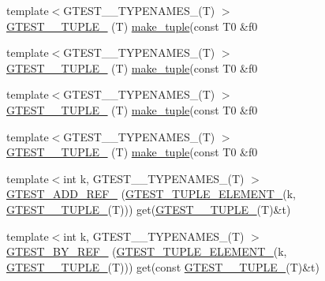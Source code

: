 \begin{DoxyCompactItemize}
\item 
{\footnotesize template$<$G\-T\-E\-S\-T\-\_\-\_\-\-T\-Y\-P\-E\-N\-A\-M\-E\-S\-\_\-(\-T) $>$ }\\\hyperlink{namespacestd_1_1tr1_a61277f5af24b20fce87a9fd94307ab34}{G\-T\-E\-S\-T\-\_\-\_\-\-T\-U\-P\-L\-E\-\_\-} (T) \hyperlink{namespacestd_1_1tr1_af7e12a0f5b5791b5b7c49a5a17b85359}{make\-\_\-tuple}(const T0 \&f0
\item 
{\footnotesize template$<$G\-T\-E\-S\-T\-\_\-\_\-\-T\-Y\-P\-E\-N\-A\-M\-E\-S\-\_\-(\-T) $>$ }\\\hyperlink{namespacestd_1_1tr1_a29c8efcb79a4749e079b704c418266e6}{G\-T\-E\-S\-T\-\_\-\_\-\-T\-U\-P\-L\-E\-\_\-} (T) \hyperlink{namespacestd_1_1tr1_af7e12a0f5b5791b5b7c49a5a17b85359}{make\-\_\-tuple}(const T0 \&f0
\item 
{\footnotesize template$<$G\-T\-E\-S\-T\-\_\-\_\-\-T\-Y\-P\-E\-N\-A\-M\-E\-S\-\_\-(\-T) $>$ }\\\hyperlink{namespacestd_1_1tr1_a6afad1f98814ccc897d0b02bc6fc4e7d}{G\-T\-E\-S\-T\-\_\-\_\-\-T\-U\-P\-L\-E\-\_\-} (T) \hyperlink{namespacestd_1_1tr1_af7e12a0f5b5791b5b7c49a5a17b85359}{make\-\_\-tuple}(const T0 \&f0
\item 
{\footnotesize template$<$G\-T\-E\-S\-T\-\_\-\_\-\-T\-Y\-P\-E\-N\-A\-M\-E\-S\-\_\-(\-T) $>$ }\\\hyperlink{namespacestd_1_1tr1_aa636d3269bf1f368a7bc09ff158bc482}{G\-T\-E\-S\-T\-\_\-\_\-\-T\-U\-P\-L\-E\-\_\-} (T) \hyperlink{namespacestd_1_1tr1_af7e12a0f5b5791b5b7c49a5a17b85359}{make\-\_\-tuple}(const T0 \&f0
\item 
{\footnotesize template$<$int k, G\-T\-E\-S\-T\-\_\-\_\-\-T\-Y\-P\-E\-N\-A\-M\-E\-S\-\_\-(\-T) $>$ }\\\hyperlink{namespacestd_1_1tr1_ad0769041710d18b917067576f84b0303}{G\-T\-E\-S\-T\-\_\-\-A\-D\-D\-\_\-\-R\-E\-F\-\_\-} (\hyperlink{gtest-tuple_8h_a1b7f133d8aa02e0b7afed7b66781eeb7}{G\-T\-E\-S\-T\-\_\-\-T\-U\-P\-L\-E\-\_\-\-E\-L\-E\-M\-E\-N\-T\-\_\-}(k, \hyperlink{namespacestd_1_1tr1_aa636d3269bf1f368a7bc09ff158bc482}{G\-T\-E\-S\-T\-\_\-\_\-\-T\-U\-P\-L\-E\-\_\-}(T))) get(\hyperlink{namespacestd_1_1tr1_aa636d3269bf1f368a7bc09ff158bc482}{G\-T\-E\-S\-T\-\_\-\_\-\-T\-U\-P\-L\-E\-\_\-}(T)\&t)
\item 
{\footnotesize template$<$int k, G\-T\-E\-S\-T\-\_\-\_\-\-T\-Y\-P\-E\-N\-A\-M\-E\-S\-\_\-(\-T) $>$ }\\\hyperlink{namespacestd_1_1tr1_a7c131d0c2462612a78012be16114f61d}{G\-T\-E\-S\-T\-\_\-\-B\-Y\-\_\-\-R\-E\-F\-\_\-} (\hyperlink{gtest-tuple_8h_a1b7f133d8aa02e0b7afed7b66781eeb7}{G\-T\-E\-S\-T\-\_\-\-T\-U\-P\-L\-E\-\_\-\-E\-L\-E\-M\-E\-N\-T\-\_\-}(k, \hyperlink{namespacestd_1_1tr1_aa636d3269bf1f368a7bc09ff158bc482}{G\-T\-E\-S\-T\-\_\-\_\-\-T\-U\-P\-L\-E\-\_\-}(T))) get(const \hyperlink{namespacestd_1_1tr1_aa636d3269bf1f368a7bc09ff158bc482}{G\-T\-E\-S\-T\-\_\-\_\-\-T\-U\-P\-L\-E\-\_\-}(T)\&t)

\end{DoxyCompactItemize}
